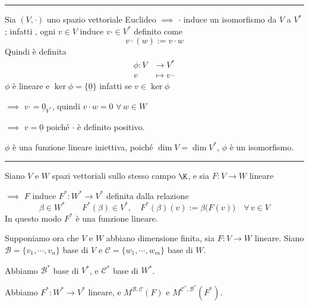
\rule{7em}{.4pt}

Sia $ (V, \cdot ) $ uno spazio vettoriale Euclideo $\implies$ $ \cdot  $ induce un isomorfismo da $ V $ a $ V^{*} $; infatti , ogni $ v \in V $ induce $ v \cdot \in V^{*} $ definito come \[
    v\!\cdot (w):= v \cdot w
\]
Quindi è definita \begin{align*}
\phi:V & \to V^{*} \\
v & \mapsto v \cdot 
\end{align*} $ \phi $ è lineare e $ \ker\phi=\{\underline{0}\} $ infatti se $ v \in \ker\phi $ 

$\implies$ $ v \cdot = \underline{0}_{V^{*}}  $, quindi $ v \cdot w= 0 $ $ \forall\, w \in W $ 

$\implies$ $ v=\underline{0} $ poiché $ \cdot  $ è definito positivo.

$ \phi $ è una funzione lineare iniettiva, poiché $ \dim V = \dim  V^{*} $, $ \phi $ è un isomorfismo.


\rule{7em}{.4pt}

Siano $ V $ e $ W $ spazi vettoriali sullo stesso campo $ \K $, e sia $ F:V\to W $ lineare 

$\implies$ $ F $ induce $ F^{*}:W^{*}\to V^{*} $ definita dalla relazione \[
    \beta \in W^{*}\qquad F^{*} (\beta) \in V^{*},\quad F^{*}(\beta)(v):= \beta\bigl(F(v)\bigr)\quad \forall\, v \in V 
\] In questo modo $ F^{*} $ è una funzione lineare.

Supponiamo ora che $ V $ e $ W $ abbiano dimensione finita, sia $ F:V\to W $ lineare. Siano $ \mathscr{B}=\{v_1, \cdots, v_{n} \} $ base di $ V $ e $ \mathscr{C}=\{w_{1}, \cdots, w_{m}\}$ base di $ W $. 

Abbiamo $ \mathscr{B}^{*} $ base di $ V^{*} $, e $ \mathscr{C}^{*} $ base di $ W^{*} $.

Abbiamo $ F^{*}:W^{*}\to V^{*} $ lineare, e $ M^{ \mathscr{B}, \mathscr{C}}(F)$ e $ M^{ \mathscr{C}^{*}, \mathscr{B}^{*}} (F^{*}) $.

